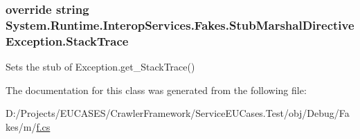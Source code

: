 \hypertarget{class_system_1_1_runtime_1_1_interop_services_1_1_fakes_1_1_stub_marshal_directive_exception_a7a773f7ff40088f0f835966dd7798e4d}{
\subsubsection[{Stack\-Trace}]{\setlength{\rightskip}{0pt plus 5cm}override string System.\-Runtime.\-Interop\-Services.\-Fakes.\-Stub\-Marshal\-Directive\-Exception.\-Stack\-Trace\hspace{0.3cm}{\ttfamily [get]}}}\label{class_system_1_1_runtime_1_1_interop_services_1_1_fakes_1_1_stub_marshal_directive_exception_a7a773f7ff40088f0f835966dd7798e4d}


Sets the stub of Exception.\-get\-\_\-\-Stack\-Trace()



The documentation for this class was generated from the following file\-:\begin{DoxyCompactItemize}
\item 
D\-:/\-Projects/\-E\-U\-C\-A\-S\-E\-S/\-Crawler\-Framework/\-Service\-E\-U\-Cases.\-Test/obj/\-Debug/\-Fakes/m/\hyperlink{m_2f_8cs}{f.\-cs}\end{DoxyCompactItemize}
